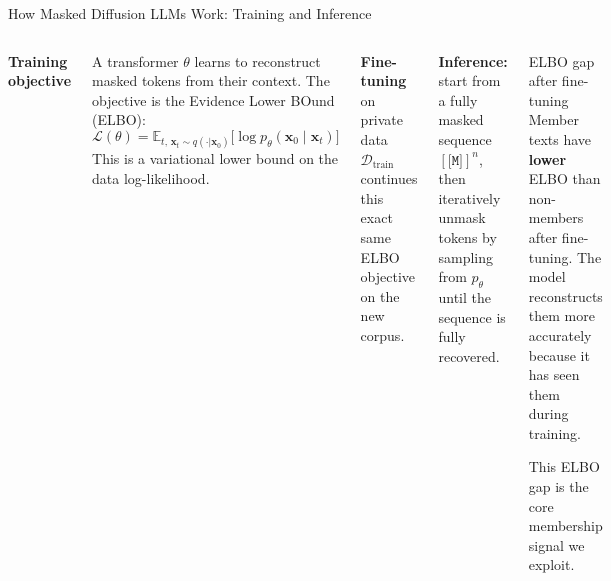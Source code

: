 \documentclass[aspectratio=169,10pt]{beamer}
\newcommand{\MASK}{\texttt{[M]}}
\begin{document}
\begin{frame}{How Masked Diffusion LLMs Work: Training and Inference}

\begin{columns}[T]

  \textbf{Training objective}

  A transformer $\theta$ learns to reconstruct masked tokens from their context.
  The objective is the Evidence Lower BOund (ELBO):
  \[
    \mathcal{L}(\theta)
      = \mathbb{E}_{t,\,\mathbf{x}_t \sim q(\cdot|\mathbf{x}_0)}
        \bigl[\log p_\theta(\mathbf{x}_0 \mid \mathbf{x}_t)\bigr]
  \]
  This is a variational lower bound on the data log-likelihood.

  \medskip
  \textbf{Fine-tuning} on private data $\mathcal{D}_\text{train}$ continues
  this exact same ELBO objective on the new corpus.

  \medskip
  \textbf{Inference:} start from a fully masked sequence $[\MASK{}]^n$,
  then iteratively unmask tokens by sampling from $p_\theta$ until the
  sequence is fully recovered.

  \begin{block}{ELBO gap after fine-tuning}
    Member texts have \textbf{lower} ELBO than non-members after fine-tuning.
    The model reconstructs them more accurately because it has seen them
    during training.

    \medskip
    This ELBO gap is the core membership signal we exploit.
  \end{block}

  \vspace{0.8em}
\end{columns}

\end{frame}
\end{document}
